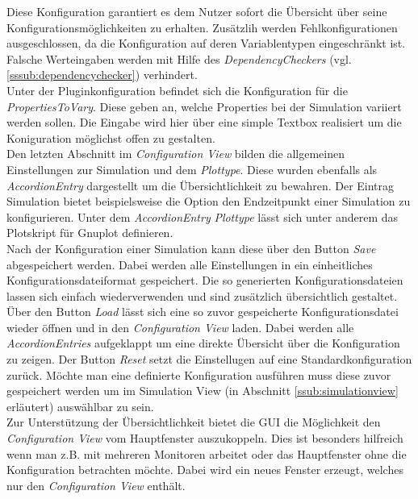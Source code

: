 \documentclass[a4paper, 11pt]{article} %
\begin{document}
 Diese Konfiguration garantiert es dem Nutzer sofort die Übersicht über seine Konfigurationsmöglichkeiten zu erhalten. Zusätzlih werden Fehlkonfigurationen ausgeschlossen, da die Konfiguration auf deren Variablentypen eingeschränkt ist. Falsche Werteingaben werden mit Hilfe des \emph{DependencyCheckers} (vgl. \ref{sssub:dependencychecker}) verhindert. \\
 Unter der Pluginkonfiguration befindet sich die Konfiguration für die \emph{PropertiesToVary}. Diese geben an, welche Properties bei der Simulation variiert werden sollen. Die Eingabe wird hier über eine simple Textbox realisiert um die Koniguration möglichst offen zu gestalten. \\
 Den letzten Abschnitt im \emph{Configuration View} bilden die allgemeinen Einstellungen zur Simulation und dem \emph{Plottype}. Diese wurden ebenfalls als \emph{AccordionEntry} dargestellt um die Übersichtlichkeit zu bewahren. Der Eintrag Simulation bietet beispielsweise die Option den Endzeitpunkt einer Simulation zu konfigurieren. Unter dem \emph{AccordionEntry} \emph{Plottype} lässt sich unter anderem das Plotskript für Gnuplot definieren.\\
 Nach der Konfiguration einer Simulation kann diese über den Button \emph{Save} abgespeichert werden. Dabei werden alle Einstellungen in ein einheitliches Konfigurationsdateiformat gespeichert. Die so generierten Konfigurationsdateien lassen sich einfach wiederverwenden und sind zusätzlich übersichtlich gestaltet. Über den Button \emph{Load} lässt sich eine so zuvor gespeicherte Konfigurationsdatei wieder öffnen und in den \emph{Configuration View} laden. Dabei werden alle \emph{AccordionEntries} aufgeklappt um eine direkte Übersicht über die Konfiguration zu zeigen. Der Button \emph{Reset} setzt die Einstellugen auf eine Standardkonfiguration zurück. Möchte man eine definierte Konfiguration ausführen muss diese zuvor gespeichert werden um im Simulation View (in Abschnitt \ref{ssub:simulationview} erläutert) auswählbar zu sein.\\
 Zur Unterstützung der Übersichtlichkeit bietet die GUI die Möglichkeit den \emph{Configuration View} vom Hauptfenster auszukoppeln. Dies ist besonders hilfreich wenn man z.B. mit mehreren Monitoren arbeitet oder das Hauptfenster ohne die Konfiguration betrachten möchte. Dabei wird ein neues Fenster erzeugt, welches nur den \emph{Configuration View} enthält.
\end{document}
